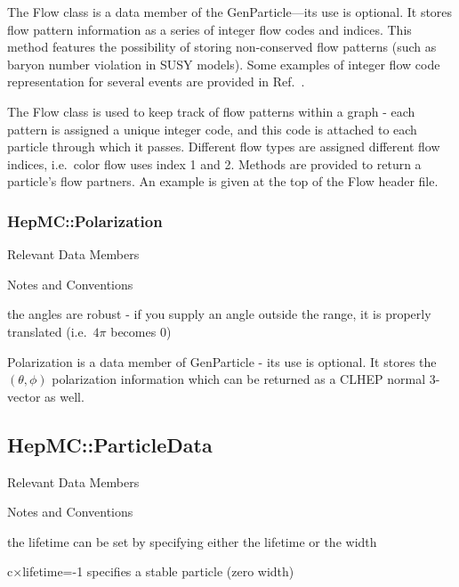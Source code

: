 \documentclass[11pt,letterpaper]{article}
\begin{document}
The Flow class is a data member of the GenParticle---its use is
optional.  It stores flow
pattern information as a series of integer flow codes and indices.
This method features the possibility
of storing non-conserved flow patterns (such as baryon number
violation in SUSY models).
Some examples of integer flow code representation for several events
are provided in Ref.~\cite{Boos:2001cv}.

The Flow class is used to keep track of flow patterns within a graph -
each pattern is assigned a unique integer code, and this code is
attached to each particle through which it passes. Different flow
types are assigned different flow indices, i.e.\ color flow uses index
1 and 2. Methods are provided to return a particle's flow partners. An
example is given at the top of the Flow header file.

%
%

\subsubsection{HepMC::Polarization}
\begin{myitemize}{Relevant Data Members}
\end{myitemize}
\begin{myitemize}{Notes and Conventions}
  \item the angles are robust - if you supply an angle outside the
    range, it is properly translated (i.e.\ $4\pi$ becomes 0)
\end{myitemize}

Polarization is a data member of GenParticle - its use is
optional. It stores the $(\theta,\phi)$ polarization information which
can be returned as a CLHEP normal 3-vector as well.

%
%

\subsection{HepMC::ParticleData}
\begin{myitemize}{Relevant Data Members}
\end{myitemize}
\begin{myitemize}{Notes and Conventions}
  \item the lifetime can be set by specifying either 
    the lifetime or the width
  \item c$\times$lifetime=-1 specifies a stable particle (zero width)
\end{myitemize}
\end{document}
